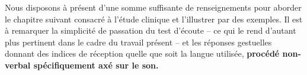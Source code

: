 Nous disposons à présent d'une somme suffisante de renseignements pour 
aborder le chapitre suivant consacré à l'étude clinique et 
l'illustrer par des exemples.
Il est à remarquer la simplicité de
passation du test d'écoute -- ce qui le rend d'autant
plus pertinent dans le cadre du travail présent -- et les réponses gestuelles
 donnant des indices de réception %
quelle que soit la langue utilisée,\textbf{ procédé non-verbal 
spécifiquement axé sur le son.}



 






